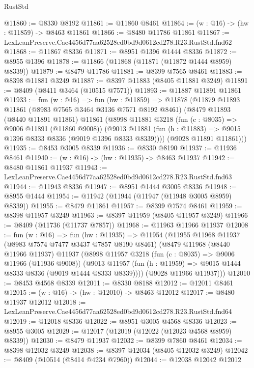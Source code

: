 \begin{lexlean}{RustStd}
\begin{coremodule}
@11860 := @8330 @8192
@11861 := @11860 @8461
@11864 := (w : @16) -> (hw : @11859) -> @8463 @11861
@11866 := @8480 @11786 @11861
@11867 := LexLeanPreserve.Cae4456d77aa62528ed0bd9d0612cd278.R23.RustStd.fnd62
@11868 := @11867 @8336
@11871 := @8951 @1396 @1444 @8336
@11872 := @8955 @1396
@11878 := @11866 (@11868 (@11871 (@11872 @1444 @8959) @8339))
@11879 := @8479 @11786
@11881 := @8399 @7565 @8461
@11883 := @8398 @11881 @3249
@11887 := @8397 @11883 (@8405 @11881 @3249)
@11891 := @8409 (@8411 @3464 (@10515 @7571))
@11893 := @11887 @11891 @11861
@11933 := fun (w : @16) =>
  fun (hw : @11859) =>
  @11878
    (@11879
      @11893
      @11861
      (@8983 @7565 @3464 @3136 @7571 @8192 @8461)
      (@8479
        @11893
        (@8440 @11891 @11861)
        @11861
        (@8998
          @11881
          @3218
          (fun (c : @8035) => @9006 @11891 (@11860 @9008))
          (@9013 @11881 (fun (h : @11883) => @9015 @1396 @8333 @8336 (@9019 @1396 @8333 @8339))))
        (@9028 @11891 @11861)))
@11935 := @8453 @3005 @8339
@11936 := @8330 @8190
@11937 := @11936 @8461
@11940 := (w : @16) -> (hw : @11935) -> @8463 @11937
@11942 := @8480 @11861 @11937
@11943 := LexLeanPreserve.Cae4456d77aa62528ed0bd9d0612cd278.R23.RustStd.fnd63
@11944 := @11943 @8336
@11947 := @8951 @1444 @3005 @8336
@11948 := @8955 @1444
@11954 := @11942 (@11944 (@11947 (@11948 @3005 @8959) @8339))
@11955 := @8479 @11861
@11957 := @8399 @7574 @8461
@11959 := @8398 @11957 @3249
@11963 := @8397 @11959 (@8405 @11957 @3249)
@11966 := @8409 (@11736 (@11737 @7857))
@11968 := @11963 @11966 @11937
@12008 := fun (w : @16) =>
  fun (hw : @11935) =>
  @11954
    (@11955
      @11968
      @11937
      (@8983 @7574 @7477 @3437 @7857 @8190 @8461)
      (@8479
        @11968
        (@8440 @11966 @11937)
        @11937
        (@8998
          @11957
          @3218
          (fun (c : @8035) => @9006 @11966 (@11936 @9008))
          (@9013 @11957 (fun (h : @11959) => @9015 @1444 @8333 @8336 (@9019 @1444 @8333 @8339))))
        (@9028 @11966 @11937)))
@12010 := @8453 @4568 @8339
@12011 := @8330 @8188
@12012 := @12011 @8461
@12015 := (w : @16) -> (hw : @12010) -> @8463 @12012
@12017 := @8480 @11937 @12012
@12018 := LexLeanPreserve.Cae4456d77aa62528ed0bd9d0612cd278.R23.RustStd.fnd64
@12019 := @12018 @8336
@12022 := @8951 @3005 @4568 @8336
@12023 := @8955 @3005
@12029 := @12017 (@12019 (@12022 (@12023 @4568 @8959) @8339))
@12030 := @8479 @11937
@12032 := @8399 @7860 @8461
@12034 := @8398 @12032 @3249
@12038 := @8397 @12034 (@8405 @12032 @3249)
@12042 := @8409 (@10514 (@8414 @4234 @7960))
@12044 := @12038 @12042 @12012

\end{coremodule}
\end{lexlean}
